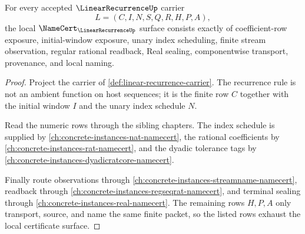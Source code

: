 \begin{theorem}
\label{thm:linear-recurrence-namecert-obligations}
For every accepted $\LinearRecurrenceUp$ carrier
$$
L=(C,I,N,S,Q,R,H,P,A),
$$
the local $\NameCert_{\LinearRecurrenceUp}$ surface consists exactly of coefficient-row exposure, initial-window exposure, unary index scheduling, finite stream observation, regular rational readback, Real sealing, componentwise transport, provenance, and local naming.
\end{theorem}
\begin{proof}
Project the carrier of \autoref{def:linear-recurrence-carrier}. The recurrence rule is not an ambient function on host sequences; it is the finite row $C$ together with the initial window $I$ and the unary index schedule $N$.

Read the numeric rows through the sibling chapters. The index schedule is supplied by \autoref{ch:concrete-instances-nat-namecert}, the rational coefficients by \autoref{ch:concrete-instances-rat-namecert}, and the dyadic tolerance tags by \autoref{ch:concrete-instances-dyadicratcore-namecert}.

Finally route observations through \autoref{ch:concrete-instances-streamname-namecert}, readback through \autoref{ch:concrete-instances-regseqrat-namecert}, and terminal sealing through \autoref{ch:concrete-instances-real-namecert}. The remaining rows $H,P,A$ only transport, source, and name the same finite packet, so the listed rows exhaust the local certificate surface.
\end{proof}

